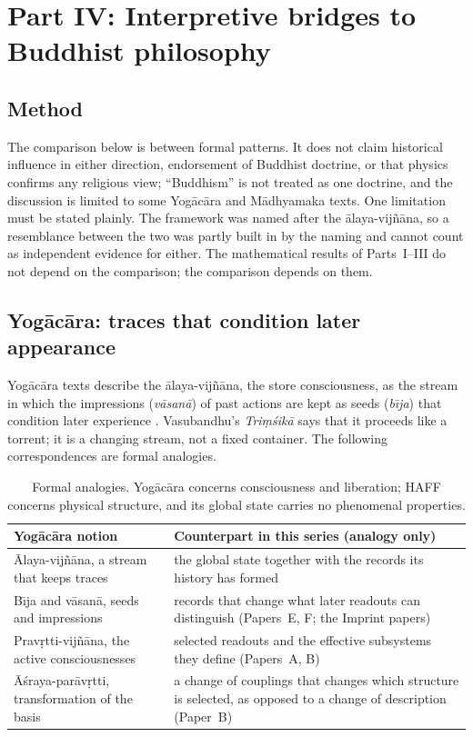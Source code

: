 \documentclass[11pt,a4paper]{article}
\begin{document}
\section{Part IV: Interpretive bridges to Buddhist philosophy}
\label{sec:bridges}

\subsection{Method}

The comparison below is between formal patterns. It does not claim historical influence in either direction, endorsement of Buddhist doctrine, or that physics confirms any religious view; ``Buddhism'' is not treated as one doctrine, and the discussion is limited to some Yog\=ac\=ara and M\=adhyamaka texts. One limitation must be stated plainly. The framework was named after the \=alaya-vij\~n\=ana, so a resemblance between the two was partly built in by the naming and cannot count as independent evidence for either. The mathematical results of Parts~I--III do not depend on the comparison; the comparison depends on them.

\subsection{Yog\=ac\=ara: traces that condition later appearance}

Yog\=ac\=ara texts describe the \=alaya-vij\~n\=ana, the store consciousness, as the stream in which the impressions (\emph{v\=asan\=a}) of past actions are kept as seeds (\emph{b\={\i}ja}) that condition later experience \cite{Asanga_Mahayana,Vasubandhu_Trimsika,Lusthaus2002,Waldron2003}. Vasubandhu's \emph{Tri\d{m}\'sik\=a} says that it proceeds like a torrent; it is a changing stream, not a fixed container. The following correspondences are formal analogies.

\begin{table}[ht]
\centering
\small
\begin{tabular}{P{5.2cm}P{8.3cm}}
\toprule
Yog\=ac\=ara notion & Counterpart in this series (analogy only)\\
\midrule
\=Alaya-vij\~n\=ana, a stream that keeps traces & the global state together with the records its history has formed\\
B\={\i}ja and v\=asan\=a, seeds and impressions & records that change what later readouts can distinguish (Papers~E, F; the Imprint papers)\\
Prav\d{r}tti-vij\~n\=ana, the active consciousnesses & selected readouts and the effective subsystems they define (Papers~A, B)\\
\=A\'sraya-par\=av\d{r}tti, transformation of the basis & a change of couplings that changes which structure is selected, as opposed to a change of description (Paper~B)\\
\bottomrule
\end{tabular}
\caption{Formal analogies. Yog\=ac\=ara concerns consciousness and liberation; HAFF concerns physical structure, and its global state carries no phenomenal properties.}
\label{tab:yogacara}
\end{table}
\end{document}

